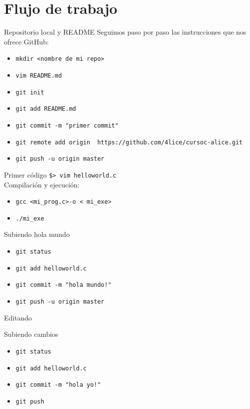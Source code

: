\documentclass{mybeamer}
\begin{document}
\section{Flujo de trabajo}
\begin{framesubsec}{Repositorio local y README}
	Seguimos paso por paso las instrucciones que nos ofrece GitHub:
	\begin{itemize}
		\item \texttt{mkdir \textless nombre de mi repo\textgreater}
		\item \texttt{vim README.md}
		\item \texttt{git init}
		\item \texttt{git add README.md}
		\item \texttt{git commit -m "primer commit"}
		\item \texttt{git remote add origin {\color{blue} https://github.com/4lice/cursoc-alice.git}}
		\item \texttt{git push -u origin master}
	\end{itemize}
\end{framesubsec}

\begin{framesubsec}{Primer código}
	\centering
	\texttt{\$\textgreater\ vim helloworld.c}
	\\[1em]
	
	\vspace{1em}
	Compilación y ejecución:
	\begin{itemize}
		\item \texttt{gcc \textless mi\_prog.c\textgreater -o \textless
			mi\_exe\textgreater}
		\item \texttt{./mi\_exe}
	\end{itemize}
\end{framesubsec}

\begin{framesubsec}{Subiendo hola mundo}
	\begin{itemize}
		\item \texttt{git status}
		\item \texttt{git add helloworld.c}
		\item \texttt{git commit -m "hola mundo!"}
		\item \texttt{git push -u origin master}
	\end{itemize}
\end{framesubsec}

\begin{framesubsec}{Editando}
	
\end{framesubsec}

\begin{framesubsec}{Subiendo cambios}
	\begin{itemize}
		\item \texttt{git status}
		\item \texttt{git add helloworld.c}
		\item \texttt{git commit -m "hola yo!"}
		\item \texttt{git push}
	\end{itemize}
\end{framesubsec}
\end{document}

